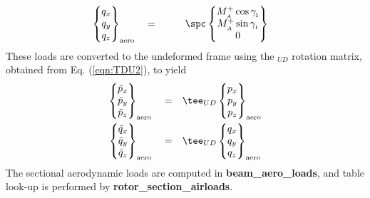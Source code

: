 \begin{equation}
\begin{aligned}
\begin{Bmatrix} q_x \\ q_y \\ q_z \end{Bmatrix}_{\textrm{aero}} \quad = \quad & \qquad \spc \begin{Bmatrix} M_{_A}^+ \cos \gamma_{_\textrm{I}} \\ M_{_A}^+ \sin \gamma_{_\textrm{I}} \\ 0 \end{Bmatrix} 
\end{aligned}
\end{equation}
These loads are converted to the undeformed frame using the \tee$_{UD}$ rotation matrix, obtained from Eq. (\ref{eqn:TDU2}), to yield 
\begin{align}
\label{eqn:aeroF}
\begin{Bmatrix} \tilde{p}_x \\ \tilde{p}_y \\ \tilde{p}_z \end{Bmatrix}_{\textrm{aero}} \quad = \quad & \tee_{UD} \begin{Bmatrix} p_x \\ p_y \\ p_z \end{Bmatrix}_{\textrm{aero}} \\
\label{eqn:aeroM}
\begin{Bmatrix} \tilde{q}_x \\ \tilde{q}_y \\ \tilde{q}_z \end{Bmatrix}_{\textrm{aero}} \quad = \quad & \tee_{UD} \begin{Bmatrix} q_x \\ q_y \\ q_z \end{Bmatrix}_{\textrm{aero}}
\end{align}
The sectional aerodynamic loads are computed in \textbf{beam\_aero\_loads}, and table look-up is performed by \textbf{rotor\_section\_airloads}.

